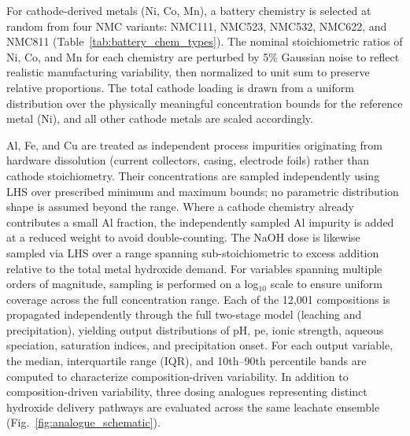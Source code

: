 \documentclass[final,2p,times]{elsarticle}
\begin{document}
For cathode-derived metals (Ni, Co, Mn), a battery chemistry is selected at random from four NMC variants: NMC111, NMC523, NMC532, NMC622, and NMC811 (Table~\ref{tab:battery_chem_types}). The nominal stoichiometric ratios of Ni, Co, and Mn for each chemistry are perturbed by 5\% Gaussian noise to reflect realistic manufacturing variability, then normalized to unit sum to preserve relative proportions. The total cathode loading is drawn from a uniform distribution over the physically meaningful concentration bounds for the reference metal (Ni), and all other cathode metals are scaled accordingly.

Al, Fe, and Cu are treated as independent process impurities originating from hardware dissolution (current collectors, casing, electrode foils) rather than cathode stoichiometry. Their concentrations are sampled independently using LHS over prescribed minimum and maximum bounds; no parametric distribution shape is assumed beyond the range. Where a cathode chemistry already contributes a small Al fraction, the independently sampled Al impurity is added at a reduced weight to avoid double-counting. The NaOH dose is likewise sampled via LHS over a range spanning sub-stoichiometric to excess addition relative to the total metal hydroxide demand. For variables spanning multiple orders of magnitude, sampling is performed on a log$_{10}$ scale to ensure uniform coverage across the full concentration range. Each of the 12{,}001 compositions is propagated independently through the full two-stage model (leaching and precipitation), yielding output distributions of pH, pe, ionic strength, aqueous speciation, saturation indices, and precipitation onset. For each output variable, the median, interquartile range (IQR), and 10th--90th percentile bands are computed to characterize composition-driven variability. In addition to composition-driven variability, three dosing analogues representing distinct hydroxide delivery pathways are evaluated across the same leachate ensemble (Fig.~\ref{fig:analogue_schematic}).
\end{document}
